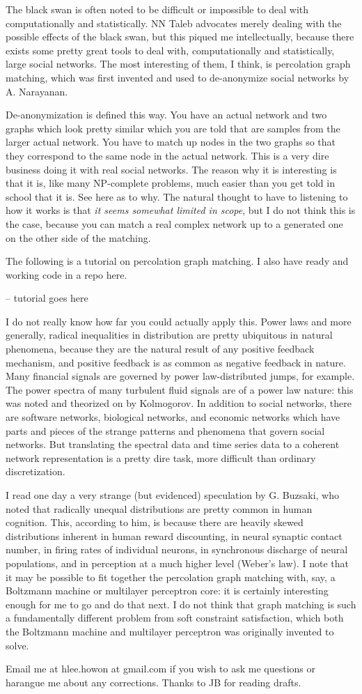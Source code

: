 \documentclass[12pt]{article}
\begin{document}
The black swan is often noted to be difficult or impossible to deal with computationally and statistically. NN Taleb advocates merely dealing with the possible effects of the black swan, but this piqued me intellectually, because there exists some pretty great tools to deal with, computationally and statistically, large social networks. The most interesting of them, I think, is percolation graph matching, which was first invented and used to de-anonymize social networks by A. Narayanan.

De-anonymization is defined this way. You have an actual network and two graphs which look pretty similar which you are told that are samples from the larger actual network. You have to match up nodes in the two graphs so that they correspond to the same node in the actual network. This is a very dire business doing it with real social networks. The reason why it is interesting is that it is, like many NP-complete problems, much easier than you get told in school that it is. See here as to why. The natural thought to have to listening to how it works is that \emph{it seems somewhat limited in scope}, but I do not think this is the case, because you can match a real complex network up to a generated one on the other side of the matching.

The following is a tutorial on percolation graph matching. I also have ready and working code in a repo here.

-- tutorial goes here

I do not really know how far you could actually apply this. Power laws and more generally, radical inequalities in distribution are pretty ubiquitous in natural phenomena, because they are the natural result of any positive feedback mechanism, and positive feedback is as common as negative feedback in nature. Many financial signals are governed by power law-distributed jumps, for example. The power spectra of many turbulent fluid signals are of a power law nature: this was noted and theorized on by Kolmogorov. In addition to social networks, there are software networks, biological networks, and economic networks which have parts and pieces of the strange patterns and phenomena that govern social networks. But translating the spectral data and time series data to a coherent network representation is a pretty dire task, more difficult than ordinary discretization.

I read one day a very strange (but evidenced) speculation by G. Buzsaki, who noted that radically unequal distributions are pretty common in human cognition. This, according to him, is because there are heavily skewed distributions inherent in human reward discounting, in neural synaptic contact number, in firing rates of individual neurons, in synchronous discharge of neural populations, and in perception at a much higher level (Weber's law). I note that it may be possible to fit together the percolation graph matching with, say, a Boltzmann machine or multilayer perceptron core: it is certainly interesting enough for me to go and do that next. I do not think that graph matching is such a fundamentally different problem from soft constraint satisfaction, which both the Boltzmann machine and multilayer perceptron was originally invented to solve.

Email me at hlee.howon at gmail.com if you wish to ask me questions or harangue me about any corrections. Thanks to JB for reading drafts.
\end{document}
